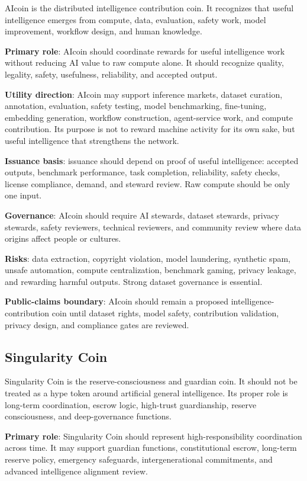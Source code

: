 \documentclass[12pt]{article}
\begin{document}
AIcoin is the distributed intelligence contribution coin. It recognizes that useful intelligence emerges from compute, data, evaluation, safety work, model improvement, workflow design, and human knowledge.

\textbf{Primary role}: AIcoin should coordinate rewards for useful intelligence work without reducing AI value to raw compute alone. It should recognize quality, legality, safety, usefulness, reliability, and accepted output.

\textbf{Utility direction}: AIcoin may support inference markets, dataset curation, annotation, evaluation, safety testing, model benchmarking, fine-tuning, embedding generation, workflow construction, agent-service work, and compute contribution. Its purpose is not to reward machine activity for its own sake, but useful intelligence that strengthens the network.

\textbf{Issuance basis}: issuance should depend on proof of useful intelligence: accepted outputs, benchmark performance, task completion, reliability, safety checks, license compliance, demand, and steward review. Raw compute should be only one input.

\textbf{Governance}: AIcoin should require AI stewards, dataset stewards, privacy stewards, safety reviewers, technical reviewers, and community review where data origins affect people or cultures.

\textbf{Risks}: data extraction, copyright violation, model laundering, synthetic spam, unsafe automation, compute centralization, benchmark gaming, privacy leakage, and rewarding harmful outputs. Strong dataset governance is essential.

\textbf{Public-claims boundary}: AIcoin should remain a proposed intelligence-contribution coin until dataset rights, model safety, contribution validation, privacy design, and compliance gates are reviewed.

\subsection{Singularity Coin}

Singularity Coin is the reserve-consciousness and guardian coin. It should not be treated as a hype token around artificial general intelligence. Its proper role is long-term coordination, escrow logic, high-trust guardianship, reserve consciousness, and deep-governance functions.

\textbf{Primary role}: Singularity Coin should represent high-responsibility coordination across time. It may support guardian functions, constitutional escrow, long-term reserve policy, emergency safeguards, intergenerational commitments, and advanced intelligence alignment review.
\end{document}

